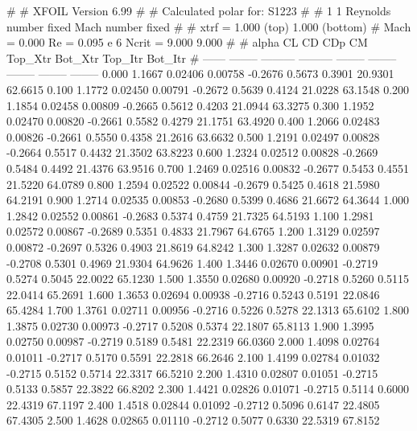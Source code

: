 #  
#       XFOIL         Version 6.99
#  
# Calculated polar for: S1223                                           
#  
# 1 1 Reynolds number fixed          Mach number fixed         
#  
# xtrf =   1.000 (top)        1.000 (bottom)  
# Mach =   0.000     Re =     0.095 e 6     Ncrit =   9.000  9.000
#  
#   alpha    CL        CD       CDp       CM     Top_Xtr  Bot_Xtr  Top_Itr  Bot_Itr
#  ------ -------- --------- --------- -------- -------- -------- -------- --------
   0.000   1.1667   0.02406   0.00758  -0.2676   0.5673   0.3901  20.9301  62.6615
   0.100   1.1772   0.02450   0.00791  -0.2672   0.5639   0.4124  21.0228  63.1548
   0.200   1.1854   0.02458   0.00809  -0.2665   0.5612   0.4203  21.0944  63.3275
   0.300   1.1952   0.02470   0.00820  -0.2661   0.5582   0.4279  21.1751  63.4920
   0.400   1.2066   0.02483   0.00826  -0.2661   0.5550   0.4358  21.2616  63.6632
   0.500   1.2191   0.02497   0.00828  -0.2664   0.5517   0.4432  21.3502  63.8223
   0.600   1.2324   0.02512   0.00828  -0.2669   0.5484   0.4492  21.4376  63.9516
   0.700   1.2469   0.02516   0.00832  -0.2677   0.5453   0.4551  21.5220  64.0789
   0.800   1.2594   0.02522   0.00844  -0.2679   0.5425   0.4618  21.5980  64.2191
   0.900   1.2714   0.02535   0.00853  -0.2680   0.5399   0.4686  21.6672  64.3644
   1.000   1.2842   0.02552   0.00861  -0.2683   0.5374   0.4759  21.7325  64.5193
   1.100   1.2981   0.02572   0.00867  -0.2689   0.5351   0.4833  21.7967  64.6765
   1.200   1.3129   0.02597   0.00872  -0.2697   0.5326   0.4903  21.8619  64.8242
   1.300   1.3287   0.02632   0.00879  -0.2708   0.5301   0.4969  21.9304  64.9626
   1.400   1.3446   0.02670   0.00901  -0.2719   0.5274   0.5045  22.0022  65.1230
   1.500   1.3550   0.02680   0.00920  -0.2718   0.5260   0.5115  22.0414  65.2691
   1.600   1.3653   0.02694   0.00938  -0.2716   0.5243   0.5191  22.0846  65.4284
   1.700   1.3761   0.02711   0.00956  -0.2716   0.5226   0.5278  22.1313  65.6102
   1.800   1.3875   0.02730   0.00973  -0.2717   0.5208   0.5374  22.1807  65.8113
   1.900   1.3995   0.02750   0.00987  -0.2719   0.5189   0.5481  22.2319  66.0360
   2.000   1.4098   0.02764   0.01011  -0.2717   0.5170   0.5591  22.2818  66.2646
   2.100   1.4199   0.02784   0.01032  -0.2715   0.5152   0.5714  22.3317  66.5210
   2.200   1.4310   0.02807   0.01051  -0.2715   0.5133   0.5857  22.3822  66.8202
   2.300   1.4421   0.02826   0.01071  -0.2715   0.5114   0.6000  22.4319  67.1197
   2.400   1.4518   0.02844   0.01092  -0.2712   0.5096   0.6147  22.4805  67.4305
   2.500   1.4628   0.02865   0.01110  -0.2712   0.5077   0.6330  22.5319  67.8152
